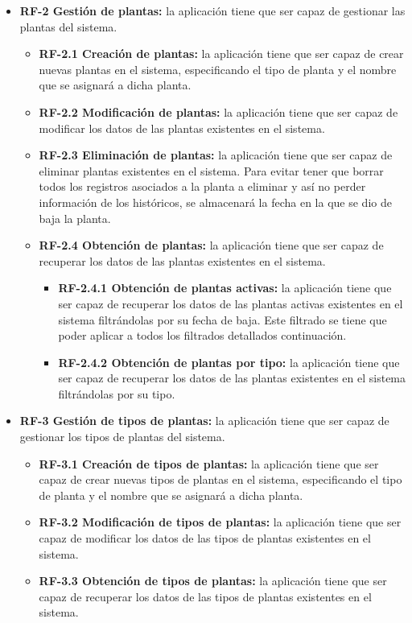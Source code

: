 \begin{itemize}
        \item \textbf{RF-2 Gestión de plantas:} la aplicación tiene que ser capaz de gestionar las plantas del sistema.
            \begin{itemize}
                \item \textbf{RF-2.1 Creación de plantas:} la aplicación tiene que ser capaz de crear nuevas plantas en el sistema, especificando el tipo de planta y el nombre que se asignará a dicha planta.
                \item \textbf{RF-2.2 Modificación de plantas:} la aplicación tiene que ser capaz de modificar los datos de las plantas existentes en el sistema.
                \item \textbf{RF-2.3 Eliminación de plantas:} la aplicación tiene que ser capaz de eliminar plantas existentes en el sistema. Para evitar tener que borrar todos los registros asociados a la planta a eliminar y así no perder información de los históricos, se almacenará la fecha en la que se dio de baja la planta.
                \item \textbf{RF-2.4 Obtención de plantas:} la aplicación tiene que ser capaz de recuperar los datos de las plantas existentes en el sistema.
                \begin{itemize}
                    \item \textbf{RF-2.4.1 Obtención de plantas activas:} la aplicación tiene que ser capaz de recuperar los datos de las plantas activas existentes en el sistema filtrándolas por su fecha de baja. Este filtrado se tiene que poder aplicar a todos los filtrados detallados continuación. 
                    \item \textbf{RF-2.4.2 Obtención de plantas por tipo:} la aplicación tiene que ser capaz de recuperar los datos de las plantas existentes en el sistema filtrándolas por su tipo.
                \end{itemize}
            \end{itemize}
            
        \item \textbf{RF-3 Gestión de tipos de plantas:} la aplicación tiene que ser capaz de gestionar los tipos de plantas del sistema.
            \begin{itemize}
                \item \textbf{RF-3.1 Creación de tipos de plantas:} la aplicación tiene que ser capaz de crear nuevas tipos de plantas en el sistema, especificando el tipo de planta y el nombre que se asignará a dicha planta.
                \item \textbf{RF-3.2 Modificación de tipos de plantas:} la aplicación tiene que ser capaz de modificar los datos de las tipos de plantas existentes en el sistema.
                \item \textbf{RF-3.3 Obtención de tipos de plantas:} la aplicación tiene que ser capaz de recuperar los datos de las tipos de plantas existentes en el sistema.
            \end{itemize}
            

\end{itemize}
